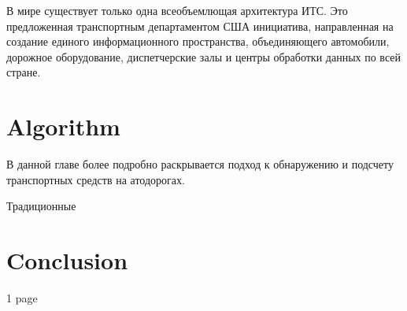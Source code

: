 \documentclass[12pt,a4paper,oneside,titlepage]{article}
\begin{document}
В мире существует только одна всеобъемлющая архитектура ИТС. Это предложенная транспортным департаментом США инициатива, направленная на создание единого информационного пространства, объединяющего автомобили, дорожное оборудование, диспетчерские залы и центры обработки данных по всей стране. 



\newpage
\section*{Algorithm}
В данной главе более подробно раскрывается подход к обнаружению и подсчету транспортных средств на атодорогах.

Традиционные 




\newpage
\section*{Conclusion}
1 page


\newpage
\renewcommand\refname{Bibliography}


\end{document}
